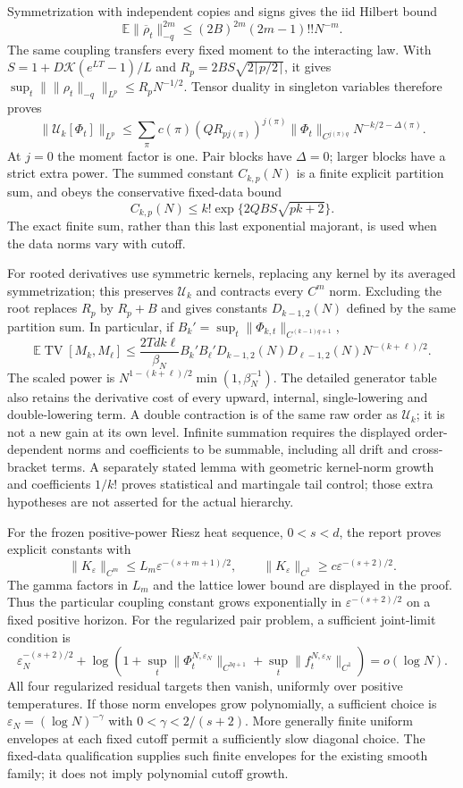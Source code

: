 \documentclass[11pt]{article}
\newcommand{\U}{\mathcal U}
\newcommand{\E}{\mathbb E}
\begin{document}
Symmetrization with independent copies and signs gives the iid Hilbert bound
\[
 \E\|\overline\rho_t\|_{-q}^{2m}
 \le (2B)^{2m}(2m-1)!!N^{-m}.
\]
The same coupling transfers every fixed moment to the interacting law. With
$S=1+D\mathcal K(e^{LT}-1)/L$ and
$R_p=2BS\sqrt{2\lceil p/2\rceil}$, it gives
$\sup_t\|\|\rho_t\|_{-q}\|_{L^p}\le R_pN^{-1/2}$.
Tensor duality in singleton variables therefore proves
\[
 \|\U_k[\Phi_t]\|_{L^p}
 \le\sum_\pi c(\pi)(QR_{pj(\pi)})^{j(\pi)}
       \|\Phi_t\|_{C^{j(\pi)q}}
           N^{-k/2-\Delta(\pi)}.
\]
At $j=0$ the moment factor is one. Pair blocks have $\Delta=0$; larger
blocks have a strict extra power. The summed constant $C_{k,p}(N)$ is a finite
explicit partition sum, and obeys the conservative fixed-data bound
\[
 C_{k,p}(N)\le k!\exp\{2QBS\sqrt{pk+2}\}.
\]
The exact finite sum, rather than this last exponential majorant, is used
when the data norms vary with cutoff.

For rooted derivatives use symmetric kernels, replacing any kernel by its
averaged symmetrization; this preserves $\U_k$ and contracts every $C^m$ norm.
Excluding the root replaces $R_p$ by $R_p+B$ and gives constants
$D_{k-1,2}(N)$ defined by the same partition sum. In particular, if
$B_k'=\sup_t\|\Phi_{k,t}\|_{C^{(k-1)q+1}}$,
\[
 \E\operatorname{TV}[M_k,M_\ell]
 \le\frac{2Td k\ell}{\beta_N}
 B_k'B_\ell'D_{k-1,2}(N)D_{\ell-1,2}(N)
                  N^{-(k+\ell)/2}.
\]
The scaled power is $N^{1-(k+\ell)/2}\min(1,\beta_N^{-1})$.
The detailed generator table also retains the derivative cost of every
upward, internal, single-lowering and double-lowering term. A double
contraction is of the same raw order as $\U_k$; it is not a new gain at its
own level. Infinite summation requires the displayed order-dependent norms
and coefficients to be summable, including all drift and cross-bracket terms.
A separately stated lemma with geometric kernel-norm growth and coefficients
$1/k!$ proves statistical and martingale tail control; those extra hypotheses
are not asserted for the actual hierarchy.

For the frozen positive-power Riesz heat sequence, $0<s<d$, the report proves
explicit constants with
\[
 \|K_\varepsilon\|_{C^m}
 \le L_m\varepsilon^{-(s+m+1)/2},\qquad
 \|K_\varepsilon\|_{C^1}\ge c\varepsilon^{-(s+2)/2}.
\]
The gamma factors in $L_m$ and the lattice lower bound are displayed in the
proof. Thus the particular coupling constant grows exponentially in
$\varepsilon^{-(s+2)/2}$ on a fixed positive horizon.
For the regularized pair problem, a sufficient joint-limit condition is
\[
 \varepsilon_N^{-(s+2)/2}
 +\log\left(1+
   \sup_t\|\Phi_t^{N,\varepsilon_N}\|_{C^{3q+1}}+
   \sup_t\|f_t^{N,\varepsilon_N}\|_{C^1}\right)=o(\log N).
\]
All four regularized residual targets then vanish, uniformly over positive
temperatures. If those norm envelopes grow polynomially, a sufficient choice
is $\varepsilon_N=(\log N)^{-\gamma}$ with $0<\gamma<2/(s+2)$.
More generally finite uniform envelopes at each fixed cutoff permit a
sufficiently slow diagonal choice. The fixed-data qualification supplies such
finite envelopes for the existing smooth family; it does not imply polynomial
cutoff growth.
\end{document}
